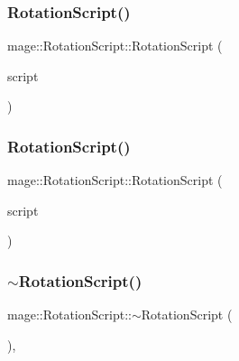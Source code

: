 \hypertarget{classmage_1_1_rotation_script_a52ee0473609565766fc1153678ee8b60}{}\label{classmage_1_1_rotation_script_a52ee0473609565766fc1153678ee8b60} 
\subsubsection{\texorpdfstring{Rotation\+Script()}{RotationScript()}\hspace{0.1cm}{\footnotesize\ttfamily [2/3]}}
{\footnotesize\ttfamily mage\+::\+Rotation\+Script\+::\+Rotation\+Script (\begin{DoxyParamCaption}\item[{const \hyperlink{classmage_1_1_rotation_script}{Rotation\+Script} \&}]{script }\end{DoxyParamCaption})\hspace{0.3cm}{\ttfamily [delete]}}

\hypertarget{classmage_1_1_rotation_script_a5c6464f8e38fde0442c3b6f49a9cbed1}{}\label{classmage_1_1_rotation_script_a5c6464f8e38fde0442c3b6f49a9cbed1} 
\subsubsection{\texorpdfstring{Rotation\+Script()}{RotationScript()}\hspace{0.1cm}{\footnotesize\ttfamily [3/3]}}
{\footnotesize\ttfamily mage\+::\+Rotation\+Script\+::\+Rotation\+Script (\begin{DoxyParamCaption}\item[{\hyperlink{classmage_1_1_rotation_script}{Rotation\+Script} \&\&}]{script }\end{DoxyParamCaption})\hspace{0.3cm}{\ttfamily [default]}}

\hypertarget{classmage_1_1_rotation_script_adc2af2d6ed93558fd66b569297b294d0}{}\label{classmage_1_1_rotation_script_adc2af2d6ed93558fd66b569297b294d0} 
\subsubsection{\texorpdfstring{$\sim$\+Rotation\+Script()}{~RotationScript()}}
{\footnotesize\ttfamily mage\+::\+Rotation\+Script\+::$\sim$\+Rotation\+Script (\begin{DoxyParamCaption}{ }\end{DoxyParamCaption})\hspace{0.3cm}{\ttfamily [virtual]}, {\ttfamily [default]}}



